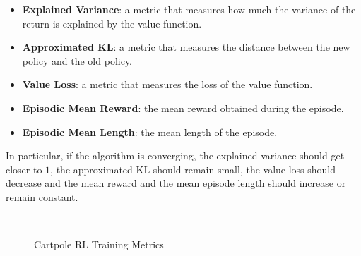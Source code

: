 \begin{itemize}
    \item \textbf{Explained Variance}: a metric that measures how much the variance of the return is explained by the value function.
    \item \textbf{Approximated KL}: a metric that measures the distance between the new policy and the old policy.
    \item \textbf{Value Loss}: a metric that measures the loss of the value function.
    \item \textbf{Episodic Mean Reward}: the mean reward obtained during the episode.
    \item \textbf{Episodic Mean Length}: the mean length of the episode.
\end{itemize}

In particular, if the algorithm is converging, the explained variance should get closer to $1$, the approximated KL should remain small, the value loss should decrease and the mean reward and the mean episode length should increase or remain constant.

\begin{figure}
    \centering
    \caption{Cartpole RL Training Metrics}
    \label{fig:cartpoleresults}
     \\
\end{figure}

